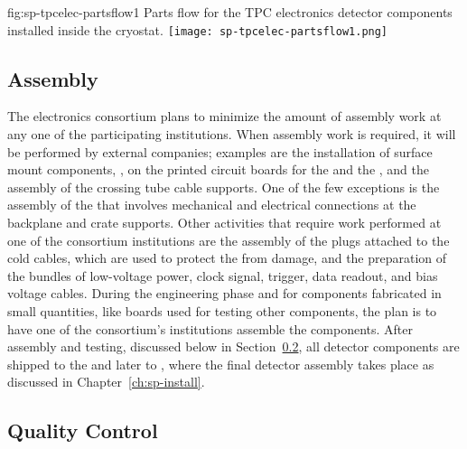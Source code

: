 \begin{dunefigure}
{fig:sp-tpcelec-partsflow1}
{Parts flow for the TPC electronics detector components installed inside the cryostat.}
\texttt{[image: sp-tpcelec-partsflow1.png]}
\end{dunefigure}


\subsection{Assembly}
\label{sec:fdsp-tpcelec-production-assembly}

The  electronics consortium plans to minimize
the amount of assembly work at any one of the participating
institutions. When assembly work is required, it will be performed
by external companies; examples are the installation of surface 
mount components, ,  on the printed 
circuit boards for the  and the , and
the assembly of the crossing tube cable supports. One of the few
exceptions is the assembly of the  that involves
mechanical and electrical connections at the backplane and crate supports.
Other activities that require 
work performed at one of the consortium institutions are the
assembly of the plugs attached to the cold cables, which are used to protect
the  from  damage, and the preparation of
the bundles of low-voltage power, clock signal, trigger, data readout,
and bias voltage cables. During the engineering
phase and for components fabricated in small quantities, 
like boards used for testing other components, the plan is to
have one of the consortium's institutions assemble the components.
After assembly and testing, discussed below in Section~\ref{sec:fdsp-tpcelec-production-qc},
all detector components are shipped to the  and
later to , where the final detector assembly
takes place as discussed in Chapter~\ref{ch:sp-install}.

\subsection{Quality Control}
\label{sec:fdsp-tpcelec-production-qc}

